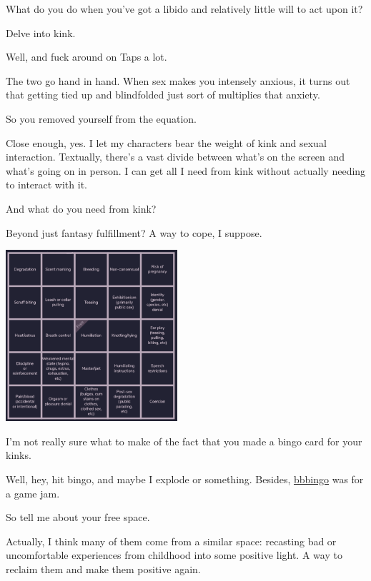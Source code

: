 \noindent What do you do when you've got a libido and relatively little will to act upon it?

Delve into kink.

\begin{ally}
Well, and fuck around on Taps a lot.
\end{ally}
The two go hand in hand. When sex makes you intensely anxious, it turns out that getting tied up and blindfolded just sort of multiplies that anxiety.

\begin{ally}
So you removed yourself from the equation.
\end{ally}
Close enough, yes. I let my characters bear the weight of kink and sexual interaction. Textually, there's a vast divide between what's on the screen and what's going on in person. I can get all I need from kink without actually needing to interact with it.

\begin{ally}
And what do you need from kink?
\end{ally}
Beyond just fantasy fulfillment? A way to cope, I suppose.

\noindent\includegraphics[width=2.5in]{assets/static/sex/kink/bingo.png}

\begin{ally}
I'm not really sure what to make of the fact that you made a bingo card for your kinks.
\end{ally}
Well, hey, hit bingo, and maybe I explode or something. Besides, \href{https://bbbingo.me}{bbbingo} was for a game jam.

\begin{ally}
So tell me about your free space.
\end{ally}
Actually, I think many of them come from a similar space: recasting bad or uncomfortable experiences from childhood into some positive light. A way to reclaim them and make them positive again.

